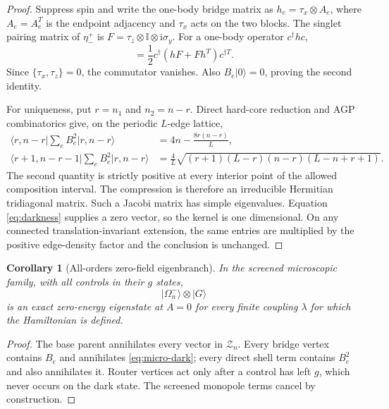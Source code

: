 \documentclass[11pt]{article}
\newtheorem{corollary}[theorem]{Corollary}
\theoremstyle{definition}
\theoremstyle{remark}
\newcommand{\Id}{\mathbb I}
\newcommand{\cZ}{\mathcal Z}
\newcommand{\ket}[1]{\lvert #1\rangle}
\newcommand{\bra}[1]{\langle #1\rvert}
\newcommand{\I}{\mathrm i}
\begin{document}
\begin{proof}
Suppress spin and write the one-body bridge matrix as
$h_e=\tau_x\otimes A_e$, where $A_e=A_e^T$ is the endpoint adjacency and $\tau_x$ acts on the two blocks.  The singlet pairing matrix of $\eta_-^+$ is $F=\tau_z\otimes\Id\otimes\I\sigma_y$.  For a one-body operator $c^\dagger h c$,
\begin{equation}
 [c^\dagger hc,\eta_F^+]
 =\frac12c^\dagger(hF+Fh^T)c^{\dagger T}.
\end{equation}
Since $\{\tau_x,\tau_z\}=0$, the commutator vanishes.  Also $B_e\ket0=0$, proving the second identity.

For uniqueness, put $r=n_1$ and $n_2=n-r$.  Direct hard-core reduction and AGP combinatorics give, on the periodic $L$-edge lattice,
\begin{align}
 \bra{r,n-r}\sum_eB_e^2\ket{r,n-r}
 &=4n-\frac{8r(n-r)}{L},
 \label{eq:B2-jacobi-diag}\\
 \bra{r+1,n-r-1}\sum_eB_e^2\ket{r,n-r}
 &=\frac4L\sqrt{(r+1)(L-r)(n-r)(L-n+r+1)}.
 \label{eq:B2-jacobi-off}
\end{align}
The second quantity is strictly positive at every interior point of the allowed composition interval.  The compression is therefore an irreducible Hermitian tridiagonal matrix.  Such a Jacobi matrix has simple eigenvalues.  Equation \eqref{eq:darkness} supplies a zero vector, so the kernel is one dimensional.  On any connected translation-invariant extension, the same entries are multiplied by the positive edge-density factor and the conclusion is unchanged.
\end{proof}

\begin{corollary}[All-orders zero-field eigenbranch]
\label{cor:allorders-dark}
In the screened microscopic family, with all controls in their $g$ states,
\begin{equation}
 \ket{\Omega_n^-}\otimes\ket G
 \label{eq:micro-dark}
\end{equation}
is an exact zero-energy eigenstate at $A=0$ for every finite coupling $\lambda$ for which the Hamiltonian is defined.
\end{corollary}

\begin{proof}
The base parent annihilates every vector in $\cZ_n$.  Every bridge vertex contains $B_e$ and annihilates \eqref{eq:micro-dark}; every direct shell term contains $B_e^2$ and also annihilates it.  Router vertices act only after a control has left $g$, which never occurs on the dark state.  The screened monopole terms cancel by construction.
\end{proof}
\end{document}
